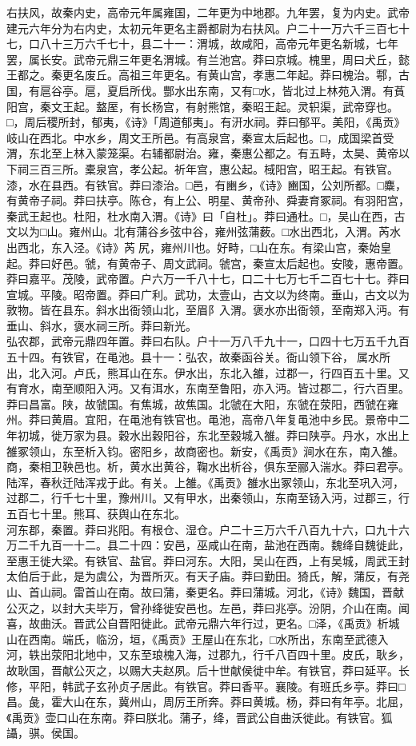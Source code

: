 \documentclass[]{article}
\begin{document}
右扶风，故秦内史，高帝元年属雍国，二年更为中地郡。九年罢，复为内史。武帝建元六年分为右内史，太初元年更名主爵都尉为右扶风。户二十一万六千三百七十七，口八十三万六千七十，县二十一：渭城，故咸阳，高帝元年更名新城，七年罢，属长安。武帝元鼎三年更名渭城。有兰池宫。莽曰京城。槐里，周曰犬丘，懿王都之。秦更名废丘。高祖三年更名。有黄山宫，孝惠二年起。莽曰槐治。鄠，古国，有扈谷亭。扈，夏启所伐。酆水出东南，又有□水，皆北过上林苑入渭。有萯阳宫，秦文王起。盩厔，有长杨宫，有射熊馆，秦昭王起。灵轵渠，武帝穿也。□，周后稷所封，郁夷，《诗》「周道郁夷」。有汧水祠。莽曰郁平。美阳，《禹贡》岐山在西北。中水乡，周文王所邑。有高泉宫，秦宣太后起也。□，成国梁首受渭，东北至上林入蒙笼渠。右辅都尉治。雍，秦惠公都之。有五畤，太昊、黄帝以下祠三百三所。橐泉宫，孝公起。祈年宫，惠公起。棫阳宫，昭王起。有铁官。漆，水在县西。有铁官。莽曰漆治。□邑，有豳乡，《诗》豳国，公刘所都。□麋，有黄帝子祠。莽曰扶亭。陈仓，有上公、明星、黄帝孙、舜妻育冢祠。有羽阳宫，秦武王起也。杜阳，杜水南入渭。《诗》曰「自杜」。莽曰通杜。□，吴山在西，古文以为□山。雍州山。北有蒲谷乡弦中谷，雍州弦蒲薮。□水出西北，入渭。芮水出西北，东入泾。《诗》芮尻，雍州川也。好畤，□山在东。有梁山宫，秦始皇起。莽曰好邑。虢，有黄帝子、周文武祠。虢宫，秦宣太后起也。安陵，惠帝置。莽曰嘉平。茂陵，武帝置。户六万一千八十七，口二十七万七千二百七十七。莽曰宣城。平陵。昭帝置。莽曰广利。武功，太壹山，古文以为终南。垂山，古文以为敦物。皆在县东。斜水出衙领山北，至眉阝入渭。褒水亦出衙领，至南郑入沔。有垂山、斜水，褒水祠三所。莽曰新光。\\
弘农郡，武帝元鼎四年置。莽曰右队。户十一万八千九十一，口四十七万五千九百五十四。有铁官，在黾池。县十一：弘农，故秦函谷关。衙山领下谷，属水所出，北入河。卢氏，熊耳山在东。伊水出，东北入雒，过郡一，行四百五十里。又有育水，南至顺阳入沔。又有洱水，东南至鲁阳，亦入沔。皆过郡二，行六百里。莽曰昌富。陕，故虢国。有焦城，故焦国。北虢在大阳，东虢在荥阳，西虢在雍州。莽曰黄眉。宜阳，在黾池有铁官也。黾池，高帝八年复黾池中乡民。景帝中二年初城，徙万家为县。穀水出穀阳谷，东北至穀城入雒。莽曰陕亭。丹水，水出上雒冢领山，东至析入钧。密阳乡，故商密也。新安，《禹贡》涧水在东，南入雒。商，秦相卫鞅邑也。析，黄水出黄谷，鞠水出析谷，俱东至郦入湍水。莽曰君亭。陆浑，春秋迁陆浑戎于此。有关。上雒。《禹贡》雒水出冢领山，东北至巩入河，过郡二，行千七十里，豫州川。又有甲水，出秦领山，东南至钖入沔，过郡三，行五百七十里。熊耳、获舆山在东北。\\
河东郡，秦置。莽曰兆阳。有根仓、湿仓。户二十三万六千八百九十六，口九十六万二千九百一十二。县二十四：安邑，巫咸山在南，盐池在西南。魏绛自魏徙此，至惠王徙大梁。有铁官、盐官。莽曰河东。大阳，吴山在西，上有吴城，周武王封太伯后于此，是为虞公，为晋所灭。有天子庙。莽曰勤田。猗氏，解，蒲反，有尧山、首山祠。雷首山在南。故曰蒲，秦更名。莽曰蒲城。河北，《诗》魏国，晋献公灭之，以封大夫毕万，曾孙绛徙安邑也。左邑，莽曰兆亭。汾阴，介山在南。闻喜，故曲沃。晋武公自晋阳徙此。武帝元鼎六年行过，更名。□泽，《禹贡》析城山在西南。端氏，临汾，垣，《禹贡》王屋山在东北，□水所出，东南至武德入河，轶出荥阳北地中，又东至琅槐入海，过郡九，行千八百四十里。皮氏，耿乡，故耿国，晋献公灭之，以赐大夫赵夙。后十世献侯徙中牟。有铁官，莽曰延平。长修，平阳，韩武子玄孙贞子居此。有铁官。莽曰香平。襄陵。有班氏乡亭。莽曰□昌。彘，霍大山在东，冀州山，周厉王所奔。莽曰黄城。杨，莽曰有年亭。北屈，《禹贡》壶口山在东南。莽曰朕北。蒲子，绛，晋武公自曲沃徙此。有铁官。狐讘，骐。侯国。\\
\end{document}
